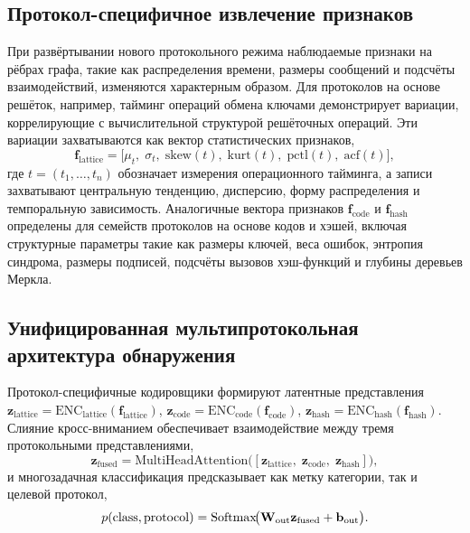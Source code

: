 \subsection{Протокол-специфичное извлечение признаков}

При развёртывании нового протокольного режима наблюдаемые признаки на рёбрах графа, такие как распределения времени, размеры сообщений и подсчёты взаимодействий, изменяются характерным образом. Для протоколов на основе решёток, например, тайминг операций обмена ключами демонстрирует вариации, коррелирующие с вычислительной структурой решёточных операций. Эти вариации захватываются как вектор статистических признаков,
\begin{equation}
\mathbf{f}_{\mathrm{lattice}}
= \bigl[\mu_t,\;\sigma_t,\;\mathrm{skew}(t),\;\mathrm{kurt}(t),\;
  \mathrm{pctl}(t),\;\mathrm{acf}(t)\bigr],
\label{eq:pq_feat_lattice}
\end{equation}
где $t=(t_1,\dots,t_n)$ обозначает измерения операционного тайминга, а записи захватывают центральную тенденцию, дисперсию, форму распределения и темпоральную зависимость. Аналогичные вектора признаков $\mathbf{f}_{\mathrm{code}}$ и $\mathbf{f}_{\mathrm{hash}}$ определены для семейств протоколов на основе кодов и хэшей, включая структурные параметры такие как размеры ключей, веса ошибок, энтропия синдрома, размеры подписей, подсчёты вызовов хэш-функций и глубины деревьев Меркла.

\subsection{Унифицированная мультипротокольная архитектура обнаружения}

Протокол-специфичные кодировщики формируют латентные представления $\mathbf{z}_{\mathrm{lattice}}=\mathrm{ENC}_{\mathrm{lattice}}(\mathbf{f}_{\mathrm{lattice}})$, $\mathbf{z}_{\mathrm{code}}=\mathrm{ENC}_{\mathrm{code}}(\mathbf{f}_{\mathrm{code}})$, $\mathbf{z}_{\mathrm{hash}}=\mathrm{ENC}_{\mathrm{hash}}(\mathbf{f}_{\mathrm{hash}})$. Слияние кросс-вниманием обеспечивает взаимодействие между тремя протокольными представлениями,
\begin{equation}
\mathbf{z}_{\mathrm{fused}}
= \mathrm{MultiHeadAttention}\!\bigl(
  [\mathbf{z}_{\mathrm{lattice}},\;
   \mathbf{z}_{\mathrm{code}},\;
   \mathbf{z}_{\mathrm{hash}}]\bigr),
\label{eq:pq_fusion}
\end{equation}
и многозадачная классификация предсказывает как метку категории, так и целевой протокол,
\begin{equation}
p(\mathrm{class},\mathrm{protocol})
= \mathrm{Softmax}\!\bigl(\mathbf{W}_{\mathrm{out}}\mathbf{z}_{\mathrm{fused}}
  + \mathbf{b}_{\mathrm{out}}\bigr).
\label{eq:pq_class}
\end{equation}

